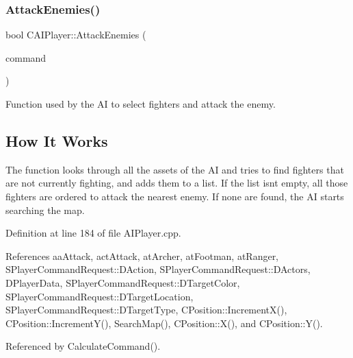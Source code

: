 \subsubsection{\texorpdfstring{Attack\+Enemies()}{AttackEnemies()}}
{\footnotesize\ttfamily bool C\+A\+I\+Player\+::\+Attack\+Enemies (\begin{DoxyParamCaption}\item[{\hyperlink{structSPlayerCommandRequest}{S\+Player\+Command\+Request} \&}]{command }\end{DoxyParamCaption})\hspace{0.3cm}{\ttfamily [protected]}}



Function used by the AI to select fighters and attack the enemy. 

\hypertarget{classCAIPlayer_aehow_sec}{}\subsection{How It Works}\label{classCAIPlayer_aehow_sec}
The function looks through all the assets of the AI and tries to find fighters that are not currently fighting, and adds them to a list. If the list isn\textquotesingle{}t empty, all those fighters are ordered to attack the nearest enemy. If none are found, the AI starts searching the map. 

Definition at line 184 of file A\+I\+Player.\+cpp.



References aa\+Attack, act\+Attack, at\+Archer, at\+Footman, at\+Ranger, S\+Player\+Command\+Request\+::\+D\+Action, S\+Player\+Command\+Request\+::\+D\+Actors, D\+Player\+Data, S\+Player\+Command\+Request\+::\+D\+Target\+Color, S\+Player\+Command\+Request\+::\+D\+Target\+Location, S\+Player\+Command\+Request\+::\+D\+Target\+Type, C\+Position\+::\+Increment\+X(), C\+Position\+::\+Increment\+Y(), Search\+Map(), C\+Position\+::\+X(), and C\+Position\+::\+Y().



Referenced by Calculate\+Command().


